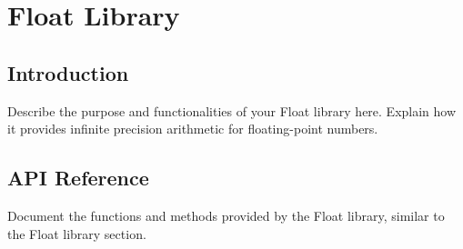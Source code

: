 
\section{Float Library}

\subsection{Introduction}

Describe the purpose and functionalities of your Float library here. Explain how it provides infinite precision arithmetic for floating-point numbers. 

\subsection{API Reference}

Document the functions and methods provided by the Float library, similar to the Float library section.

